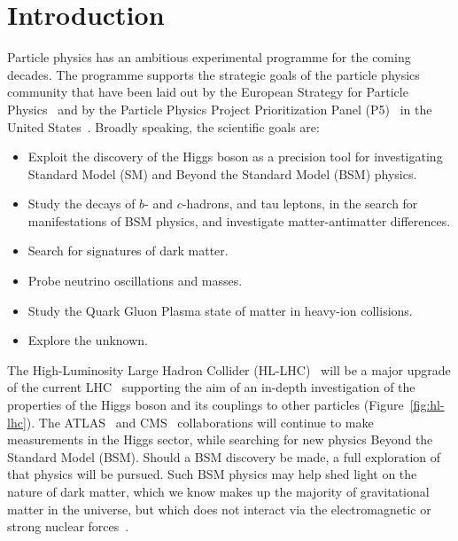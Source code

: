 

\hypertarget{introduction}{%
\section{Introduction}\label{introduction}}

Particle physics has an ambitious experimental programme for the
coming decades. The programme supports the strategic goals of the
particle physics community that have been laid out by the European
Strategy for Particle Physics~\cite{ESPP2013} and by
the Particle Physics Project Prioritization Panel (P5)~\cite{DOE-P5} in the United
States~\cite{2014pwa}. Broadly speaking, the
scientific goals are:

\begin{itemize}
\item Exploit the discovery of the Higgs boson as a precision tool
  for investigating Standard Model (SM) and Beyond the Standard Model
  (BSM) physics.
\item
  Study the decays of $b$- and $c$-hadrons, and tau leptons, in the search
  for manifestations of BSM physics, and investigate
  matter-antimatter differences.
\item
  Search for signatures of dark matter.
\item
  Probe neutrino oscillations and masses.
\item
  Study the Quark Gluon Plasma state of matter in heavy-ion collisions.
\item
  Explore the unknown.
\end{itemize}

The High-Luminosity Large Hadron Collider
(HL-LHC)~\cite{HL-LHC,1742-6596-515-1-012012,Apollinari:2284929}
will be a major
upgrade of the current LHC~\cite{LHC} supporting the aim of
an in-depth investigation of the properties of the Higgs boson and its
couplings to other particles (Figure~\ref{fig:hl-lhc}). The ATLAS~\cite{ATLAS} and CMS~\cite{CMS}
collaborations will continue to make measurements in the Higgs sector,
while searching for new physics Beyond the Standard Model (BSM). Should
a BSM discovery be made, a full exploration of that physics will be
pursued. Such BSM physics may help shed light on the nature of dark
matter, which we know makes up the majority of gravitational matter in
the universe, but which does not interact via the electromagnetic or
strong nuclear forces~\cite{Mangano2016}.

